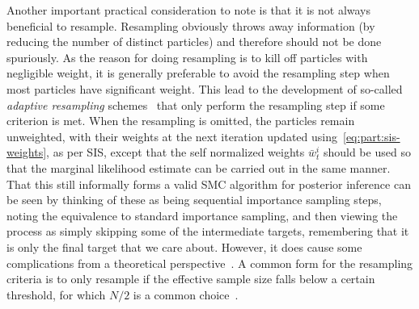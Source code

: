 Another important practical consideration to note is that it is not always beneficial to resample.  Resampling
obviously throws away information (by reducing the number of distinct particles)
and therefore should not be done spuriously.  As the reason for doing
resampling is to kill off particles with negligible weight, it is generally preferable to avoid the resampling step
when most particles have significant weight.  This lead to the development of so-called \emph{adaptive resampling}
schemes~\citep{liu1995blind,del2012adaptive} that only perform the resampling step if some criterion is met.  
When the resampling is omitted, the particles remain unweighted, with their weights at the next iteration updated
using~\eqref{eq:part:sis-weights}, as per SIS, except that the self normalized weights $\bar{w}_t^i$ should be used so that the
marginal likelihood estimate can be carried out in the same manner.
That this still informally forms a valid SMC algorithm for posterior inference can be seen by thinking of these as being sequential importance
sampling steps, noting the equivalence to standard importance sampling, and then viewing the process as simply
skipping some of the intermediate targets, remembering that it is only the final target that we care about.
However, it does cause some complications from a theoretical perspective~\citep{del2012adaptive}.  A common
form for the resampling criteria is to only resample if the effective sample size falls below a certain threshold,
for which $N/2$ is a common choice~\cite{doucet2009tutorial}.

